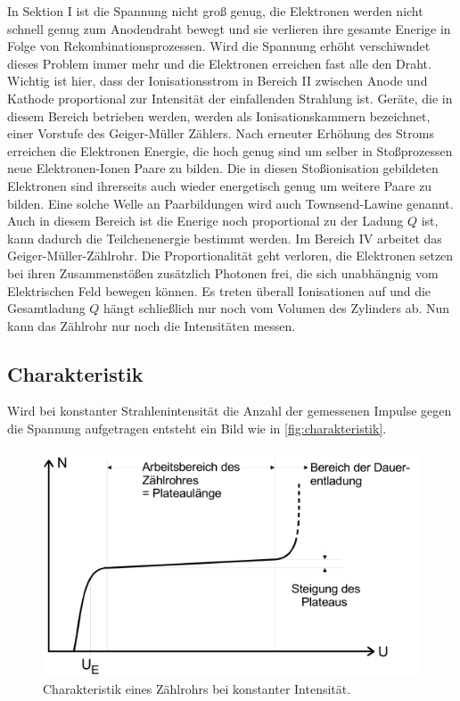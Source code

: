 In Sektion I ist die Spannung nicht groß genug, die Elektronen werden nicht schnell genug zum Anodendraht bewegt und sie verlieren ihre gesamte Enerige in Folge von Rekombinationsprozessen.
Wird die Spannung erhöht verschiwndet dieses Problem immer mehr und die Elektronen erreichen fast alle den Draht.
Wichtig ist hier, dass der Ionisationsstrom in Bereich II zwischen Anode und Kathode proportional zur Intensität der einfallenden Strahlung ist.
Geräte, die in diesem Bereich betrieben werden, werden als Ionisationskammern bezeichnet, einer Vorstufe des Geiger-Müller Zählers.
Nach erneuter Erhöhung des Stroms erreichen die Elektronen Energie, die hoch genug sind um selber in Stoßprozessen neue Elektronen-Ionen Paare zu bilden. 
Die in diesen Stoßionisation gebildeten Elektronen sind ihrerseits auch wieder energetisch genug um weitere Paare zu bilden.
Eine solche Welle an Paarbildungen wird auch Townsend-Lawine genannt.
Auch in diesem Bereich ist die Enerige noch proportional zu der Ladung $Q$ ist, kann dadurch die Teilchenenergie bestimmt werden.
Im Bereich IV arbeitet das Geiger-Müller-Zählrohr.
Die Proportionalität geht verloren, die Elektronen setzen bei ihren Zusammenstößen zusätzlich Photonen frei, die sich unabhängnig vom Elektrischen Feld bewegen können. 
Es treten überall Ionisationen auf und die Gesamtladung $Q$ hängt schließlich nur noch vom Volumen des Zylinders ab. Nun kann das Zählrohr nur noch die Intensitäten messen.

\subsection{Charakteristik}
\label{ssec:t2}

Wird bei konstanter Strahlenintensität die Anzahl der gemessenen Impulse gegen die Spannung aufgetragen entsteht ein Bild wie in \autoref{fig:charakteristik}.

\begin{figure}
    \centering
    \includegraphics[width=\textwidth]{images/bild4.png}
    \caption{Charakteristik eines Zählrohrs bei konstanter Intensität.\cite{V703}}
    \label{fig:charakteristik}
\end{figure}

